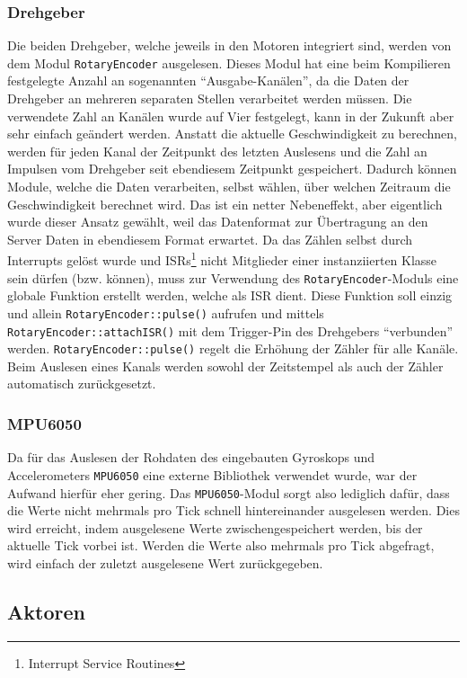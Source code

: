 \subsubsection{Drehgeber}
Die beiden Drehgeber,
welche jeweils in den Motoren integriert sind,
werden von dem Modul \texttt{RotaryEncoder} ausgelesen.
%
Dieses Modul hat eine beim Kompilieren festgelegte Anzahl an sogenannten ``Ausgabe-Kanälen'',
da die Daten der Drehgeber an mehreren separaten Stellen verarbeitet werden müssen.
%
Die verwendete Zahl an Kanälen wurde auf Vier festgelegt, kann in der Zukunft aber sehr einfach geändert werden.
%
Anstatt die aktuelle Geschwindigkeit zu berechnen,
werden für jeden Kanal der Zeitpunkt des letzten Auslesens
und die Zahl an Impulsen vom Drehgeber seit ebendiesem Zeitpunkt gespeichert.
%
Dadurch können Module, welche die Daten verarbeiten,
selbst wählen, über welchen Zeitraum die Geschwindigkeit berechnet wird.
%
Das ist ein netter Nebeneffekt, aber eigentlich wurde dieser Ansatz gewählt,
weil das Datenformat zur Übertragung an den Server Daten in ebendiesem Format erwartet.
%
Da das Zählen selbst durch Interrupts gelöst wurde
und ISRs\footnote{Interrupt Service Routines}
nicht Mitglieder einer instanziierten Klasse sein dürfen (bzw. können),
muss zur Verwendung des \texttt{RotaryEncoder}-Moduls eine globale Funktion erstellt werden,
welche als ISR dient.
%
Diese Funktion soll einzig und allein \texttt{RotaryEncoder::pulse()} aufrufen
und mittels \texttt{RotaryEncoder::attachISR()} mit dem Trigger-Pin des Drehgebers ``verbunden'' werden.
%
\texttt{RotaryEncoder::pulse()} regelt die Erhöhung der Zähler für alle Kanäle.
%
Beim Auslesen eines Kanals werden sowohl der Zeitstempel als auch der Zähler automatisch zurückgesetzt.

\subsubsection{MPU6050}
Da für das Auslesen der Rohdaten des eingebauten Gyroskops und Accelerometers
\texttt{MPU6050} eine externe Bibliothek \cite{adafruit-mpu6050} verwendet wurde,
war der Aufwand hierfür eher gering.
%
Das \texttt{MPU6050}-Modul sorgt also lediglich dafür,
dass die Werte nicht mehrmals pro Tick schnell hintereinander ausgelesen werden.
%
Dies wird erreicht,
indem ausgelesene Werte zwischengespeichert werden,
bis der aktuelle Tick vorbei ist.
%
Werden die Werte also mehrmals pro Tick abgefragt,
wird einfach der zuletzt ausgelesene Wert zurückgegeben.

\subsection{Aktoren}
